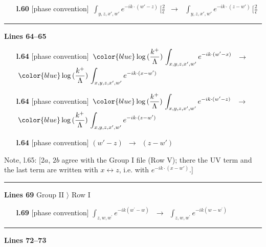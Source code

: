 \documentclass[10pt]{article}
\newenvironment{notebox}{\def\FrameCommand{{\color{notebar}\vrule width 1.5pt}\hspace{6pt}}\MakeFramed{\advance\hsize-\width\FrameRestore}\small}{\endMakeFramed}
\begin{document}
\begin{itemize}[leftmargin=2.2em,itemsep=1pt,topsep=2pt]
\item[\textbf{l.60}] \textsf{\small [phase convention]} $\displaystyle \,\int_{y,z,x',w'}e^{-ik\cdot(w'-z)}\, [\frac{2}{\epsilon}$\ $\longrightarrow$\ $\displaystyle \,\int_{y,z,x',w'}e^{-ik\cdot(z-w')}\, [\frac{2}{\epsilon}$
\end{itemize}
\noindent\rule{\linewidth}{0.3pt}\par\noindent\textbf{Lines 64--65} \par
\begin{itemize}[leftmargin=2.2em,itemsep=1pt,topsep=2pt]
\item[\textbf{l.64}] \textsf{\small [phase convention]} $\displaystyle \,{\color{blue}\log{(\frac{k^{+}}{\Lambda})}}\,\int_{x,y,z,x',w'}e^{-ik\cdot(w'-x)}\,$\ $\longrightarrow$\ $\displaystyle \,{\color{blue}\log{(\frac{k^{+}}{\Lambda})}}\,\int_{x,y,z,x',w'}e^{-ik\cdot(x-w')}\,$
\item[\textbf{l.64}] \textsf{\small [phase convention]} $\displaystyle \,{\color{blue}\log{(\frac{k^{+}}{\Lambda})}}\,\int_{x,y,z,x',w'}e^{-ik\cdot(w'-z)}\,$\ $\longrightarrow$\ $\displaystyle \,{\color{blue}\log{(\frac{k^{+}}{\Lambda})}}\,\int_{x,y,z,x',w'}e^{-ik\cdot(z-w')}\,$
\item[\textbf{l.64}] \textsf{\small [phase convention]} $\displaystyle (w'-z)$\ $\longrightarrow$\ $\displaystyle (z-w')$
\end{itemize}
\begin{notebox}\textsf{\small Note, l.65:} [$2a$, $2b$ agree with the Group I file (Row V); there the UV term and the last term are written with $x\leftrightarrow z$, i.e. with $e^{-ik\cdot(x-w')}$.]\end{notebox}
\noindent\rule{\linewidth}{0.3pt}\par\noindent\textbf{Lines 69} \quad \textsf{Group II $\rangle$ Row I} \par
\begin{itemize}[leftmargin=2.2em,itemsep=1pt,topsep=2pt]
\item[\textbf{l.69}] \textsf{\small [phase convention]} $\displaystyle \int_{z,w,w^{\prime}} e^{-ik(w^{\prime}-w)}\,$\ $\longrightarrow$\ $\displaystyle \int_{z,w,w^{\prime}} e^{-ik(w-w^{\prime})}\,$
\end{itemize}
\noindent\rule{\linewidth}{0.3pt}\par\noindent\textbf{Lines 72--73} \par
\end{document}
